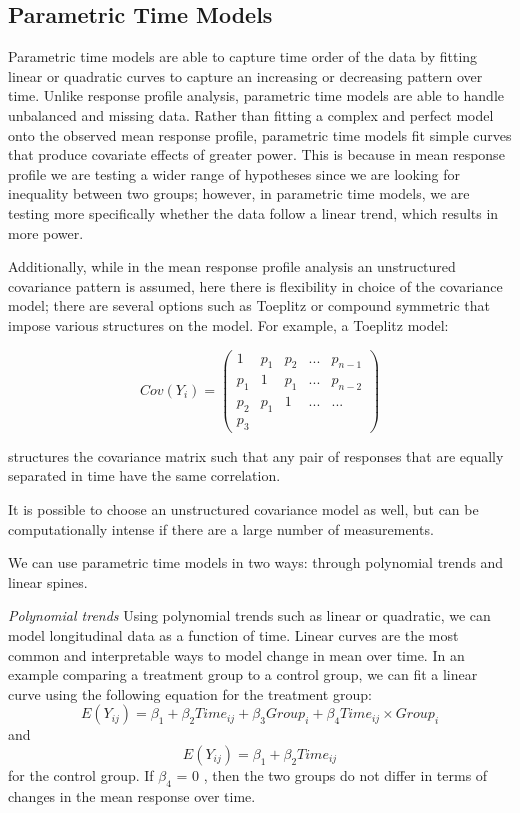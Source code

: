 \documentclass[12pt, twoside]{amherstthesis}
\theoremstyle{definition}
\theoremstyle{definition}
\theoremstyle{definition}
\theoremstyle{remark}
\begin{document}
\hypertarget{parametric-time-models}{%
\subsection{Parametric Time Models}\label{parametric-time-models}}

Parametric time models are able to capture time order of the data by fitting linear or quadratic curves to capture an increasing or decreasing pattern over time. Unlike response profile analysis, parametric time models are able to handle unbalanced and missing data. Rather than fitting a complex and perfect model onto the observed mean response profile, parametric time models fit simple curves that produce covariate effects of greater power. This is because in mean response profile we are testing a wider range of hypotheses since we are looking for inequality between two groups; however, in parametric time models, we are testing more specifically whether the data follow a linear trend, which results in more power.

Additionally, while in the mean response profile analysis an unstructured covariance pattern is assumed, here there is flexibility in choice of the covariance model; there are several options such as Toeplitz or compound symmetric that impose various structures on the model. For example, a Toeplitz model:

\[Cov (Y_i) = \begin{pmatrix} 1 & p_1 & p_2 & ... & p_{n-1} \\ p_1 & 1 & p_1 & ... & p_{n-2} \\ p_2 & p_1 & 1 & ...& ... \\ p_3   \end{pmatrix}\]

structures the covariance matrix such that any pair of responses that are equally separated in time have the same correlation.

It is possible to choose an unstructured covariance model as well, but can be computationally intense if there are a large number of measurements.

We can use parametric time models in two ways: through polynomial trends and linear spines.

\emph{Polynomial trends}
Using polynomial trends such as linear or quadratic, we can model longitudinal data as a function of time. Linear curves are the most common and interpretable ways to model change in mean over time. In an example comparing a treatment group to a control group, we can fit a linear curve using the following equation for the treatment group: \[E(Y_{ij}) = \beta_1 + \beta_2Time_{ij}+\beta_3Group_i+\beta_4Time_{ij} \times Group_i\] and
\[E(Y_{ij}) = \beta_1 + \beta_2Time_{ij}\] for the control group. If \(\beta_4\) = 0 , then the two groups do not differ in terms of changes in the mean response over time.
\end{document}
